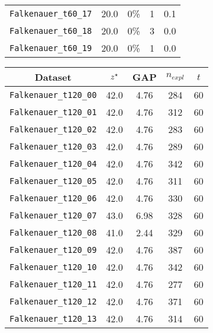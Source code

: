 \begin{figure}[!ht]
{\begin{minipage}{0.47\linewidth}
\begin{tabular}{|ccccc|}
			\texttt{Falkenauer\_t60\_17} & 20.0           & 0\% & 1               & 0.1       \\
			\texttt{Falkenauer\_t60\_18} & 20.0           & 0\% & 3               & 0.0         \\
			\texttt{Falkenauer\_t60\_19} & 20.0           & 0\% & 1               & 0.0 \\
			\hline  
		\end{tabular}
	\end{minipage}
	\begin{minipage}{0.47\linewidth}
		\centering
		\begin{tabular}{|ccccc|}
			\hline
			\rowcolor{gray!50}
			Dataset                       & ${z}^{\star}$ & GAP  & $n_{expl}$ & $t$ \\
			\hline
			\texttt{Falkenauer\_t120\_00} & 42.0           & 4.76 & 284             & 60      \\
			\texttt{Falkenauer\_t120\_01} & 42.0           & 4.76 & 312             & 60       \\
			\texttt{Falkenauer\_t120\_02} & 42.0           & 4.76 & 283             & 60      \\
			\texttt{Falkenauer\_t120\_03} & 42.0           & 4.76 & 289             & 60      \\
			\texttt{Falkenauer\_t120\_04} & 42.0           & 4.76 & 342             & 60      \\
			\texttt{Falkenauer\_t120\_05} & 42.0           & 4.76 & 311             & 60      \\
			\texttt{Falkenauer\_t120\_06} & 42.0           & 4.76 & 330             & 60      \\
			\texttt{Falkenauer\_t120\_07} & 43.0           & 6.98 & 328             & 60      \\
			\texttt{Falkenauer\_t120\_08} & 41.0           & 2.44 & 329             & 60      \\
			\texttt{Falkenauer\_t120\_09} & 42.0           & 4.76 & 387             & 60      \\
			\texttt{Falkenauer\_t120\_10} & 42.0           & 4.76 & 342             & 60      \\
			\texttt{Falkenauer\_t120\_11} & 42.0           & 4.76 & 277             & 60      \\
			\texttt{Falkenauer\_t120\_12} & 42.0           & 4.76 & 371             & 60      \\
			\texttt{Falkenauer\_t120\_13} & 42.0           & 4.76 & 314             & 60      \\

\end{tabular}
\end{minipage}}
\end{figure}
